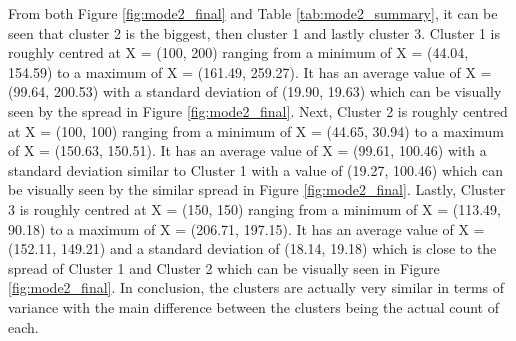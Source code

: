 \begin{enumerate}
\begin{enumerate}[label=\alph*)]
                  From both Figure \ref{fig:mode2_final} and Table \ref{tab:mode2_summary}, it can be seen that cluster 2 is the biggest, then cluster 1 and lastly cluster 3. Cluster 1
                  is roughly centred at X = (100, 200) ranging from a minimum of X = (44.04, 154.59) to a maximum of X = (161.49, 259.27). It has an average value of X = (99.64, 200.53)
                  with a standard deviation of (19.90, 19.63) which can be visually seen by the spread in Figure \ref{fig:mode2_final}. Next, Cluster 2 is 
                  roughly centred at X = (100, 100) ranging from a minimum of X = (44.65, 30.94) to a maximum of X = (150.63, 150.51). It has an average value of X = (99.61, 100.46) 
                  with a standard deviation similar to Cluster 1 with a value of (19.27, 100.46) which can be visually seen by the similar spread in Figure \ref{fig:mode2_final}. 
                  Lastly, Cluster 3 is roughly centred at X = (150, 150) ranging from a minimum of X = (113.49, 90.18) to a maximum of X = (206.71, 197.15). It has an average value 
                  of X = (152.11, 149.21) and a standard deviation of (18.14, 19.18) which is close to the spread of Cluster 1 and Cluster 2 which can be visually 
                  seen in Figure \ref{fig:mode2_final}. In conclusion, the clusters are actually very similar in terms of variance with the main difference between the clusters
                  being the actual count of each.

        \end{enumerate}

\end{enumerate}